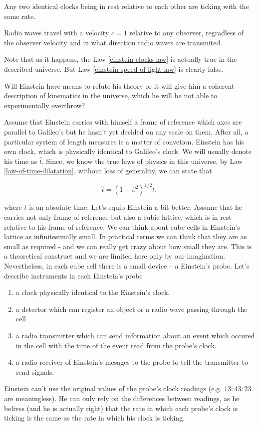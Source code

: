 \documentclass[main.tex]{subfiles}
\begin{document}
\begin{law}
\label{einstein-clocks-law}
Any two identical clocks being in rest relative to each other are ticking with the same rate.
\end{law}
 
\begin{law}
\label{einstein-speed-of-light-law}
Radio waves travel with a velocity $c = 1$ relative to any observer, regradless of the observer velocity and in what direction radio waves are transmited.
\end{law}

Note that as it happens, the Law \ref{einstein-clocks-law} is actually true in the described universe. But Law \ref{einstein-speed-of-light-law} is clearly false.

Will Einstein have means to refute his theory or it will give him a coherent description of kinematics in the universe, which he will be not able to experimentally overthrow?

Assume that Einstein carries with himself a frame of reference which axes are parallel to Galileo's but he hasn't yet decided on any scale on them. After all, a particular system of length measures is a matter of convetion. Einstein has his own clock, which is physically identical to Galileo's clock. We will usually denote his time as $\hat{t}$.
Since, we know the true laws of physics in this universe, by Law \ref{law-of-time-dilatation}, without loss of generality, we can state that 

\begin{equation}
\label{ether-time-dilatation}
\hat{t} = (1 - \beta^2)^{1/2} t,
\end{equation} 

where $t$ is an absolute time. Let's equip Einstein a bit better. Assume that he carries not only frame of reference but also a cubic lattice, which is in rest relative to his frame of reference. We can think about cube cells in Einstein's lattice as infinitesimally small. In practical terms we can think that they are as small as required - and we can really get crazy about how small they are. This is a theoretical construct and we are limited here only by our imagination. Nevertheless, in each cube cell there is a small device -- a Einstein's probe. Let's describe instruments in each Einstein's probe
\begin{enumerate}
\item a clock physically identical to the Einstein's clock.
\item a detector which can register an object or a radio wave passing through the cell
\item a radio transmitter which can send information about an event which occured in the cell with the time of the event read from the probe's clock.
\item a radio receiver of Einstein's mesages to the probe to tell the transmitter to send signals.
 \end{enumerate} 
Einstein can't use the original values of the probe's clock readings (e.g. $13:43:23$ are meaningless). He can only rely on the differences between readings, as he belives (and he is actually right) that the rate in which each probe's clock is ticking is the same as the rate in which his clock is ticking.
\end{document}
